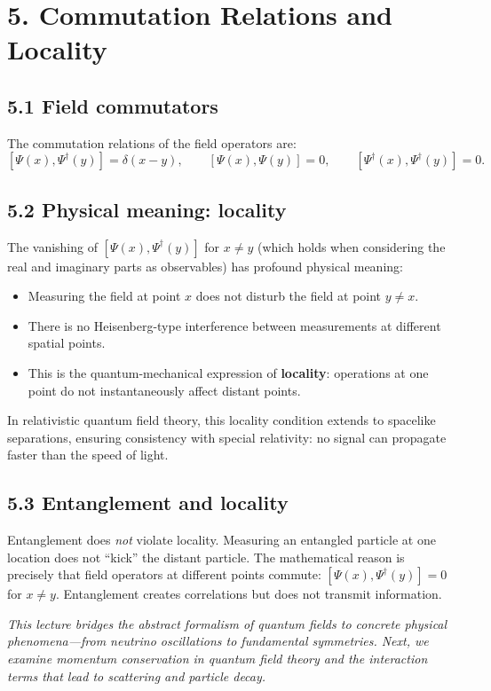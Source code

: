 \documentclass[12pt,a4paper]{article}
\begin{document}
\section{5. Commutation Relations and Locality}

\subsection{5.1 Field commutators}

The commutation relations of the field operators are:
\[
    [\Psi(x), \Psi^\dagger(y)] = \delta(x - y), \qquad [\Psi(x), \Psi(y)] = 0, \qquad [\Psi^\dagger(x), \Psi^\dagger(y)] = 0.
\]

\subsection{5.2 Physical meaning: locality}

The vanishing of $[\Psi(x), \Psi^\dagger(y)]$ for $x \neq y$ (which holds when considering the real and imaginary parts as observables) has profound physical meaning:
\begin{itemize}[nosep]
    \item Measuring the field at point $x$ does not disturb the field at point $y \neq x$.
    \item There is no Heisenberg-type interference between measurements at different spatial points.
    \item This is the quantum-mechanical expression of \textbf{locality}: operations at one point do not instantaneously affect distant points.
\end{itemize}
In relativistic quantum field theory, this locality condition extends to spacelike separations, ensuring consistency with special relativity: no signal can propagate faster than the speed of light.

\subsection{5.3 Entanglement and locality}

Entanglement does \emph{not} violate locality.  Measuring an entangled particle at one location does not ``kick'' the distant particle.  The mathematical reason is precisely that field operators at different points commute: $[\Psi(x), \Psi^\dagger(y)] = 0$ for $x \neq y$.  Entanglement creates correlations but does not transmit information.

\medskip
\noindent\textit{This lecture bridges the abstract formalism of quantum fields to concrete physical phenomena---from neutrino oscillations to fundamental symmetries.  Next, we examine momentum conservation in quantum field theory and the interaction terms that lead to scattering and particle decay.}
\end{document}
